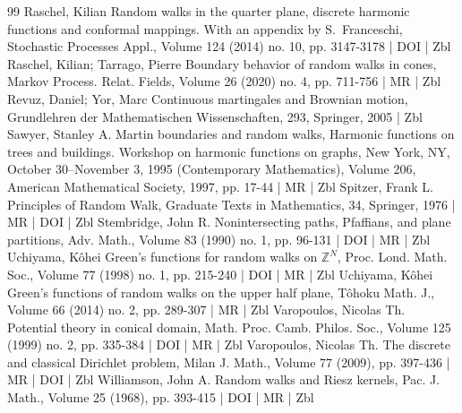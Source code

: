 \begin{thebibliography}{99}
Raschel, Kilian Random walks in the quarter plane, discrete harmonic functions and conformal mappings. With an appendix by S. Franceschi, Stochastic Processes Appl., Volume 124 (2014) no. 10, pp. 3147-3178 | DOI | Zbl
Raschel, Kilian; Tarrago, Pierre Boundary behavior of random walks in cones, Markov Process. Relat. Fields, Volume 26 (2020) no. 4, pp. 711-756 | MR | Zbl
Revuz, Daniel; Yor, Marc Continuous martingales and Brownian motion, Grundlehren der Mathematischen Wissenschaften, 293, Springer, 2005 | Zbl
Sawyer, Stanley A. Martin boundaries and random walks, Harmonic functions on trees and buildings. Workshop on harmonic functions on graphs, New York, NY, October 30–November 3, 1995 (Contemporary Mathematics), Volume 206, American Mathematical Society, 1997, pp. 17-44 | MR | Zbl
Spitzer, Frank L. Principles of Random Walk, Graduate Texts in Mathematics, 34, Springer, 1976 | MR | DOI | Zbl
Stembridge, John R. Nonintersecting paths, Pfaffians, and plane partitions, Adv. Math., Volume 83 (1990) no. 1, pp. 96-131 | DOI | MR | Zbl
Uchiyama, Kôhei Green’s functions for random walks on $\mathbb{Z}^{N}$, Proc. Lond. Math. Soc., Volume 77 (1998) no. 1, pp. 215-240 | DOI | MR | Zbl
Uchiyama, Kôhei Green’s functions of random walks on the upper half plane, Tôhoku Math. J., Volume 66 (2014) no. 2, pp. 289-307 | MR | Zbl
Varopoulos, Nicolas Th. Potential theory in conical domain, Math. Proc. Camb. Philos. Soc., Volume 125 (1999) no. 2, pp. 335-384 | DOI | MR | Zbl
Varopoulos, Nicolas Th. The discrete and classical Dirichlet problem, Milan J. Math., Volume 77 (2009), pp. 397-436 | MR | DOI | Zbl
Williamson, John A. Random walks and Riesz kernels, Pac. J. Math., Volume 25 (1968), pp. 393-415 | DOI | MR | Zbl
\end{thebibliography}
